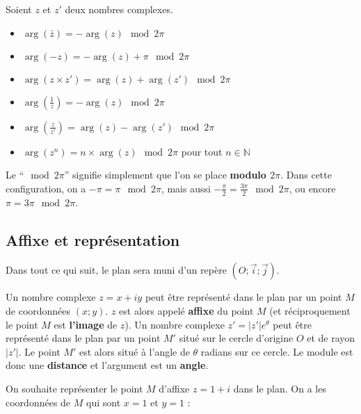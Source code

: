 	\begin{formula}[Formules]
		Soient $z$ et $z'$ deux nombres complexes.
		\begin{itemize}
			\item $\operatorname{arg}(\bar{z}) = - \operatorname{arg}(z) \mod 2\pi$
			\item $\operatorname{arg}(- z) = - \operatorname{arg}(z) + \pi \mod 2\pi$
			\item $\operatorname{arg}(z \times z') = \operatorname{arg}(z) + \operatorname{arg}(z') \mod 2\pi$
			\item $\operatorname{arg}\left(\frac{1}{z}\right) = - \operatorname{arg}(z) \mod 2\pi$
			\item $\operatorname{arg}\left(\frac{z}{z'}\right) = \operatorname{arg}(z) - \operatorname{arg}(z') \mod 2\pi$
			\item $\operatorname{arg}(z^n) = n \times \operatorname{arg}(z) \mod 2\pi$ pour tout $n \in \mathbb{N}$
		\end{itemize}
	\end{formula}

	\begin{tip}
		Le ``$\mod 2\pi$'' signifie simplement que l'on se place \textbf{modulo $2\pi$}. Dans cette configuration, on a $-\pi = \pi \mod 2\pi$, mais aussi $-\frac{\pi}{2} = \frac{3 \pi}{2} \mod 2\pi$, ou encore $\pi = 3\pi \mod 2\pi$.
	\end{tip}

	\subsection{Affixe et représentation}

	Dans tout ce qui suit, le plan sera muni d'un repère $(O; \overrightarrow{i}; \overrightarrow{j})$.

	\begin{formula}
		Un nombre complexe $z = x+iy$ peut être représenté dans le plan par un point $M$ de coordonnées $(x; y)$. $z$ est alors appelé \textbf{affixe} du point $M$ (et réciproquement le point $M$ est \textbf{l'image} de $z$).
		\newpar
		Un nombre complexe $z' = |z'| e^{\theta}$ peut être représenté dans le plan par un point $M'$ situé sur le cercle d'origine $O$ et de rayon
		$|z'|$. Le point $M'$ est alors situé à l'angle de $\theta$ radians sur ce cercle. Le module est donc une \textbf{distance} et l'argument est un \textbf{angle}.
	\end{formula}

	\begin{tip}[Exemple]
		On souhaite représenter le point $M$ d'affixe $z = 1 + i$ dans le plan. On a les coordonnées de $M$ qui sont $x = 1$ et $y = 1$ :
	\end{tip}

